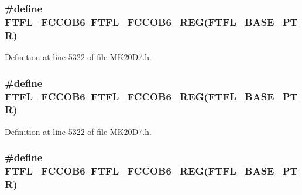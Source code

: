 \subsubsection[{\texorpdfstring{F\+T\+F\+L\+\_\+\+F\+C\+C\+O\+B6}{FTFL_FCCOB6}}]{\setlength{\rightskip}{0pt plus 5cm}\#define F\+T\+F\+L\+\_\+\+F\+C\+C\+O\+B6~{\bf F\+T\+F\+L\+\_\+\+F\+C\+C\+O\+B6\+\_\+\+R\+EG}({\bf F\+T\+F\+L\+\_\+\+B\+A\+S\+E\+\_\+\+P\+TR})}\hypertarget{group___f_t_f_l___register___accessor___macros_ga05a48ff9647b7c29da71e4f031385897}{}\label{group___f_t_f_l___register___accessor___macros_ga05a48ff9647b7c29da71e4f031385897}


Definition at line 5322 of file M\+K20\+D7.\+h.

\subsubsection[{\texorpdfstring{F\+T\+F\+L\+\_\+\+F\+C\+C\+O\+B6}{FTFL_FCCOB6}}]{\setlength{\rightskip}{0pt plus 5cm}\#define F\+T\+F\+L\+\_\+\+F\+C\+C\+O\+B6~{\bf F\+T\+F\+L\+\_\+\+F\+C\+C\+O\+B6\+\_\+\+R\+EG}({\bf F\+T\+F\+L\+\_\+\+B\+A\+S\+E\+\_\+\+P\+TR})}\hypertarget{group___f_t_f_l___register___accessor___macros_ga05a48ff9647b7c29da71e4f031385897}{}\label{group___f_t_f_l___register___accessor___macros_ga05a48ff9647b7c29da71e4f031385897}


Definition at line 5322 of file M\+K20\+D7.\+h.

\subsubsection[{\texorpdfstring{F\+T\+F\+L\+\_\+\+F\+C\+C\+O\+B6}{FTFL_FCCOB6}}]{\setlength{\rightskip}{0pt plus 5cm}\#define F\+T\+F\+L\+\_\+\+F\+C\+C\+O\+B6~{\bf F\+T\+F\+L\+\_\+\+F\+C\+C\+O\+B6\+\_\+\+R\+EG}({\bf F\+T\+F\+L\+\_\+\+B\+A\+S\+E\+\_\+\+P\+TR})}\hypertarget{group___f_t_f_l___register___accessor___macros_ga05a48ff9647b7c29da71e4f031385897}{}\label{group___f_t_f_l___register___accessor___macros_ga05a48ff9647b7c29da71e4f031385897}


